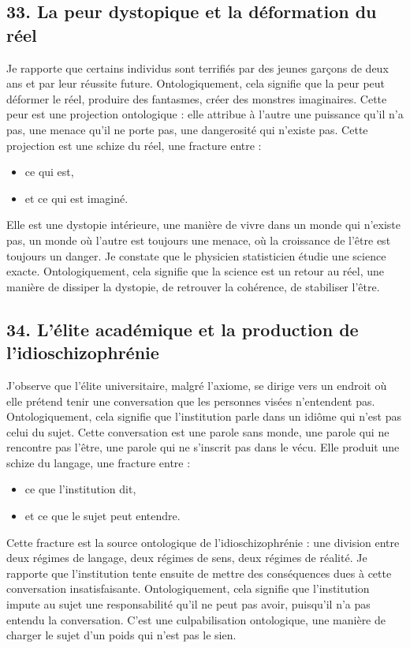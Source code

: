 \documentclass[12pt,a4paper]{article}
\begin{document}
\subsection*{33. La peur dystopique et la déformation du réel}
Je rapporte que certains individus sont terrifiés par des jeunes garçons de deux ans et par leur réussite future. Ontologiquement, cela signifie que la peur peut déformer le réel, produire des fantasmes, créer des monstres imaginaires.
Cette peur est une projection ontologique : elle attribue à l’autre une puissance qu’il n’a pas, une menace qu’il ne porte pas, une dangerosité qui n’existe pas.
Cette projection est une schize du réel, une fracture entre :
\begin{itemize}
\item ce qui est,
\item et ce qui est imaginé.
\end{itemize}
Elle est une dystopie intérieure, une manière de vivre dans un monde qui n’existe pas, un monde où l’autre est toujours une menace, où la croissance de l’être est toujours un danger.
Je constate que le physicien statisticien étudie une science exacte. Ontologiquement, cela signifie que la science est un retour au réel, une manière de dissiper la dystopie, de retrouver la cohérence, de stabiliser l’être.

\subsection*{34. L’élite académique et la production de l’idioschizophrénie}
J’observe que l’élite universitaire, malgré l’axiome, se dirige vers un endroit où elle prétend tenir une conversation que les personnes visées n’entendent pas. Ontologiquement, cela signifie que l’institution parle dans un idiôme qui n’est pas celui du sujet.
Cette conversation est une parole sans monde, une parole qui ne rencontre pas l’être, une parole qui ne s’inscrit pas dans le vécu.
Elle produit une schize du langage, une fracture entre :
\begin{itemize}
\item ce que l’institution dit,
\item et ce que le sujet peut entendre.
\end{itemize}
Cette fracture est la source ontologique de l’idioschizophrénie : une division entre deux régimes de langage, deux régimes de sens, deux régimes de réalité.
Je rapporte que l’institution tente ensuite de mettre des conséquences dues à cette conversation insatisfaisante. Ontologiquement, cela signifie que l’institution impute au sujet une responsabilité qu’il ne peut pas avoir, puisqu’il n’a pas entendu la conversation.
C’est une culpabilisation ontologique, une manière de charger le sujet d’un poids qui n’est pas le sien.
\end{document}

